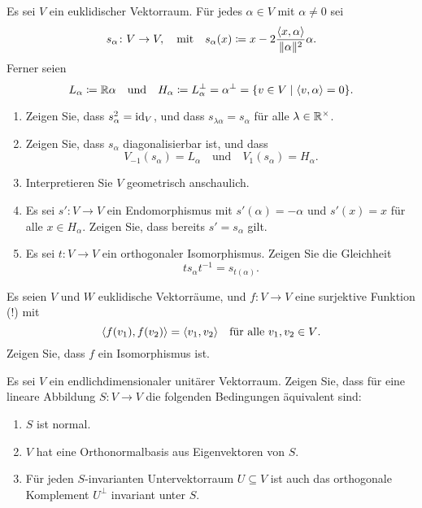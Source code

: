\documentclass[a4paper,10pt]{scrartcl}
\begin{document}
\begin{question}
  Es sei $V$ ein euklidischer Vektorraum.
  Für jedes $\alpha \in V$ mit $\alpha \neq 0$ sei
  \[
    s_\alpha \colon V \to V,
    \quad\text{mit}\quad
              s_\alpha(x)
    \coloneqq x - 2 \frac{\langle x, \alpha \rangle}{\|\alpha\|^2} \alpha.
  \]
  Ferner seien
  \[
              L_\alpha
    \coloneqq \mathbb{R} \alpha
    \quad\text{und}\quad
              H_\alpha
    \coloneqq L_\alpha^\perp
    =         \alpha^\perp
    =         \{ v \in V \mid \langle v, \alpha \rangle = 0 \}.
  \]
  \begin{enumerate}[leftmargin=*]
    \item
      Zeigen Sie, dass $s_\alpha^2 = \operatorname{id}_V$, und dass $s_{\lambda \alpha} = s_\alpha$ für alle $\lambda \in \mathbb{R}^\times$.
    \item
      Zeigen Sie, dass $s_\alpha$ diagonalisierbar ist, und dass
      \[
        V_{-1}(s_\alpha) = L_\alpha
        \quad\text{und}\quad
        V_1(s_\alpha) = H_\alpha.
      \]
    \item
      Interpretieren Sie $V$ geometrisch anschaulich.
    \item
      Es sei $s' \colon V \to V$ ein Endomorphismus mit $s'(\alpha) = -\alpha$ und $s'(x) = x$ für alle $x \in H_\alpha$.
      Zeigen Sie, dass bereits $s' = s_\alpha$ gilt.
    \item
      Es sei $t \colon V \to V$ ein orthogonaler Isomorphismus. Zeigen Sie die Gleichheit
      \[
        t s_\alpha t^{-1} = s_{t(\alpha)}.
      \]
  \end{enumerate}
\end{question}


\begin{question}
  Es seien $V$ und $W$ euklidische Vektorräume, und $f \colon V \to V$ eine surjektive Funktion (!) mit
  \[
    \langle f(v_1), f(v_2) \rangle = \langle v_1, v_2 \rangle
    \quad
    \text{für alle $v_1, v_2 \in V$}.
  \]
  Zeigen Sie, dass $f$ ein Isomorphismus ist.
\end{question}


\begin{question}
  Es sei $V$ ein endlichdimensionaler unitärer Vektorraum.
  Zeigen Sie, dass für eine lineare Abbildung $S \colon V \to V$ die folgenden Bedingungen äquivalent sind:
  \begin{enumerate}
    \item
      $S$ ist normal.
    \item
      $V$ hat eine Orthonormalbasis aus Eigenvektoren von $S$.
    \item
      Für jeden $S$-invarianten Untervektorraum $U \subseteq V$ ist auch das orthogonale Komplement $U^\perp$ invariant unter $S$.
  \end{enumerate}
\end{question}
\end{document}
